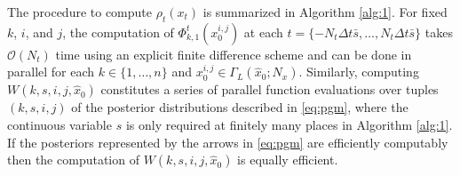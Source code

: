 \documentclass[letterpaper,10pt,conference]{ieeeconf}
\newtheorem{thm}{Theorem}
\begin{document}
The procedure to compute  $\rho_t(x_t)$ is summarized in Algorithm \ref{alg:1}.
For fixed $k$, $i$, and $j$, the computation of $\Phi_{k,1}^t(x_0^{i,j})$ at each $t = \{-N_t \Delta t \bar{s} ,\dots, N_t \Delta t \bar{s}\}$ takes $\mathcal{O}(N_t)$ time using an explicit finite difference scheme and can be done in parallel for each $k \in \{1,\dots, n\}$ and $x_0^{i,j} \in \Gamma_L( \hat{x}_0; N_x)$.
Similarly, computing $W(k,s,i,j,\hat{x}_0)$ constitutes a series of parallel function evaluations over tuples $(k,s,i,j)$ of the posterior distributions described in \eqref{eq:pgm}, where the continuous variable $s$ is only required at finitely many places in Algorithm \ref{alg:1}.
If the posteriors represented by the arrows in \eqref{eq:pgm} are efficiently computably then the computation of $W(k,s,i,j, \hat{x}_0)$ is equally efficient.
\end{document}
